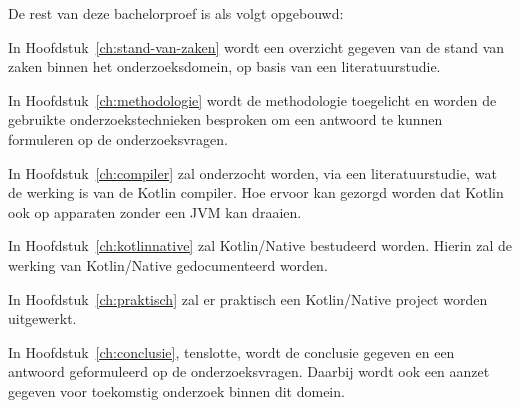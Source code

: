 De rest van deze bachelorproef is als volgt opgebouwd:

In Hoofdstuk~\ref{ch:stand-van-zaken} wordt een overzicht gegeven van de stand van zaken binnen het onderzoeksdomein, op basis van een literatuurstudie.

In Hoofdstuk~\ref{ch:methodologie} wordt de methodologie toegelicht en worden de gebruikte onderzoekstechnieken besproken om een antwoord te kunnen formuleren op de onderzoeksvragen.

In Hoofdstuk~\ref{ch:compiler} zal onderzocht worden, via een literatuurstudie, wat de werking is van de Kotlin compiler. Hoe ervoor kan gezorgd worden dat Kotlin ook op apparaten zonder een JVM kan draaien.

In Hoofdstuk~\ref{ch:kotlinnative} zal Kotlin/Native bestudeerd worden. Hierin zal de werking van Kotlin/Native gedocumenteerd worden.

In Hoofdstuk~\ref{ch:praktisch} zal er praktisch een Kotlin/Native project worden uitgewerkt.

In Hoofdstuk~\ref{ch:conclusie}, tenslotte, wordt de conclusie gegeven en een antwoord geformuleerd op de onderzoeksvragen. Daarbij wordt ook een aanzet gegeven voor toekomstig onderzoek binnen dit domein.

